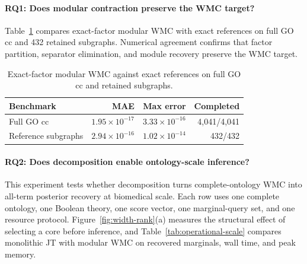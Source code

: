 \documentclass[letterpaper]{article}
\begin{document}
\paragraph{RQ1: Does modular contraction preserve the WMC target?}
Table~\ref{tab:exactness} compares exact-factor modular WMC with
exact references on full GO cc and 432 retained subgraphs. Numerical
agreement confirms that factor partition, separator elimination, and
module recovery preserve the WMC target.

\begin{table}[t]
\centering
\scriptsize
\setlength{\tabcolsep}{3pt}
\begin{tabular}{lrrr}
\toprule
Benchmark & MAE & Max error & Completed \\
\midrule
Full GO cc & \(1.95{\times}10^{-17}\) & \(3.33{\times}10^{-16}\) & 4,041/4,041 \\
Reference subgraphs & \(2.94{\times}10^{-16}\) & \(1.02{\times}10^{-14}\) & 432/432 \\
\bottomrule
\end{tabular}
\caption{
Exact-factor modular WMC against exact references on full GO cc and
retained subgraphs.
}
\label{tab:exactness}
\end{table}

\paragraph{RQ2: Does decomposition enable ontology-scale inference?}
This experiment tests whether decomposition turns complete-ontology WMC
into all-term posterior recovery at biomedical scale. Each row uses one
complete ontology, one Boolean theory, one score vector, one marginal-query
set, and one resource protocol. Figure~\ref{fig:width-rank}(a) measures the
structural effect of selecting a core before inference, and
Table~\ref{tab:operational-scale} compares monolithic JT with modular WMC
on recovered marginals, wall time, and peak memory.
\end{document}
